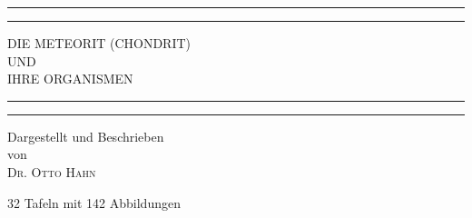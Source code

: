 \documentclass[a4paper, 11pt, oneside]{article}
\begin{document}
\begin{titlepage} %
	\centering %
	\scshape %

	
	\rule{\textwidth}{1.6pt}\vspace*{-\baselineskip}\vspace*{2pt} %
	\rule{\textwidth}{0.4pt} %
	
	\vspace{0.75\baselineskip} %
	
	{\LARGE DIE METEORIT (CHONDRIT)\\ UND\\ IHRE ORGANISMEN\\} %
	
	\vspace{0.75\baselineskip} %
	
	\rule{\textwidth}{0.4pt}\vspace*{-\baselineskip}\vspace{3.2pt} %
	\rule{\textwidth}{1.6pt} %
	
	\vspace{1\baselineskip} %
	
	
	{Dargestellt und Beschrieben\\ von\\ \scshape\Large Dr. Otto Hahn\\} %
	
	\vspace*{1\baselineskip} %
	
    {\small 32 Tafeln mit 142 Abbildungen} %
    
	
	\vspace{1\baselineskip} %
	
	

\end{titlepage}
\end{document}

